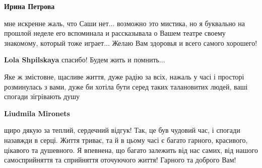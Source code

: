 \begin{itemize}
\begin{itemize}
\textbf{Ирина Петрова} 

мне искренне жаль, что Саши нет... возможно это мистика, но я буквально на
прошлой неделе его вспоминала и рассказывала о Вашем театре своему знакомому,
который тоже играет... Желаю Вам здоровья и всего самого хорошего!

\textbf{Lola Shpilskaya} спасибо! Будем жить и помнить...
\end{itemize} %


Яке ж змістовне, щасливе життя, дуже радію за всіх, нажаль у часі і просторі
розминулась з вами, дуже би хотіла бути серед таких талановитих людей, ваші
спогади зігрівають душу

\textbf{Liudmila Mironets} 

щиро дякую за теплий, сердечний відгук! Так, це був чудовий час, і спогади
назавжди в серці. Життя триває, та й в цьому часі є багато гарного, красивого,
цікавого та душевного. Я впевнена, що багато залежить від нас самих, від нашого
самосприйняття та сприйняття оточуючого життя! Гарного та доброго Вам!

\end{itemize} %
